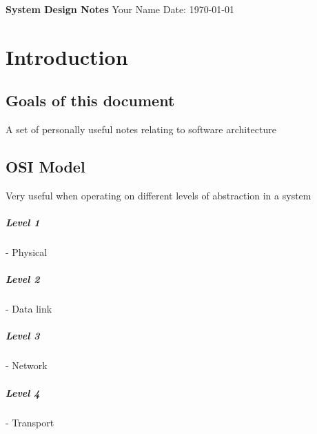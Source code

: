 \documentclass[a4paper, 11pt]{book}
\begin{document}
    \begin{titlepage}
        \centering
        \vspace*{2in}
        \Huge \textbf{System Design Notes}
        \vfill
        \Large Your Name
        \vfill
        \Large Date: \today
    \end{titlepage}

    \newpage

    \tableofcontents

    \newpage

    \listoffigures

    \newpage

    \lstlistoflistings

    \newpage


    \chapter{Introduction}

    \section{Goals of this document}
    A set of personally useful notes relating to software architecture

    \section{OSI Model}
    Very useful when operating on different levels of abstraction in a system

    \paragraph{Level 1} - Physical

    \paragraph{Level 2} - Data link

    \paragraph{Level 3} - Network

    \paragraph{Level 4} - Transport
\end{document}
